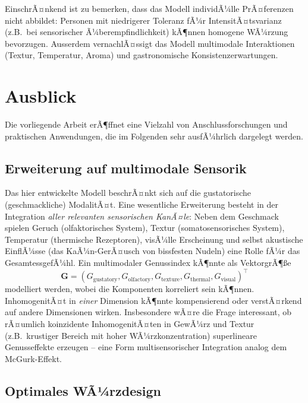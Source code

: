 ﻿\documentclass[12pt,a4paper]{article}
\theoremstyle{definition}
\begin{document}
EinschrÃ¤nkend ist zu bemerken, dass das Modell individÃ¼lle PrÃ¤ferenzen
nicht abbildet: Personen mit niedrigerer Toleranz fÃ¼r IntensitÃ¤tsvarianz
(z.B.\ bei sensorischer Ã¼berempfindlichkeit) kÃ¶nnen homogene WÃ¼rzung
bevorzugen. Ausserdem vernachlÃ¤ssigt das Modell multimodale Interaktionen
(Textur, Temperatur, Aroma) und gastronomische Konsistenzerwartungen.

\section{Ausblick}\label{sec:ausblick}

Die vorliegende Arbeit erÃ¶ffnet eine Vielzahl von Anschlussforschungen
und praktischen Anwendungen, die im Folgenden sehr ausfÃ¼hrlich dargelegt
werden.

\subsection{Erweiterung auf multimodale Sensorik}

Das hier entwickelte Modell beschrÃ¤nkt sich auf die gustatorische
(geschmackliche) ModalitÃ¤t. Eine wesentliche Erweiterung besteht in der
Integration \emph{aller relevanten sensorischen KanÃ¤le}: Neben dem
Geschmack spielen Geruch (olfaktorisches System), Textur (somatosensorisches
System), Temperatur (thermische Rezeptoren), visÃ¼lle Erscheinung und selbst
akustische EinflÃ¼sse (das KaÃ¼n-GerÃ¤usch von bissfesten Nudeln) eine Rolle
fÃ¼r das GesamtessgefÃ¼hl. Ein multimodaler Genussindex kÃ¶nnte als
VektorgrÃ¶{\ss}e
\[
  \mathbf{G} = (G_{\mathrm{gustatory}}, G_{\mathrm{olfactory}}, G_{\mathrm{texture}},
               G_{\mathrm{thermal}}, G_{\mathrm{visual}})^\top
\]
modelliert werden, wobei die Komponenten korreliert sein kÃ¶nnen. InhomogenitÃ¤t
in \emph{einer} Dimension kÃ¶nnte kompensierend oder verstÃ¤rkend auf andere
Dimensionen wirken. Insbesondere wÃ¤re die Frage interessant, ob rÃ¤umlich
koinzidente InhomogenitÃ¤ten in GewÃ¼rz und Textur (z.B.\ krustiger Bereich
mit hoher WÃ¼rzkonzentration) superlineare Genusseffekte erzeugen --
eine Form multisensorischer Integration analog dem McGurk-Effekt.

\subsection{Optimales WÃ¼rzdesign}
\end{document}
